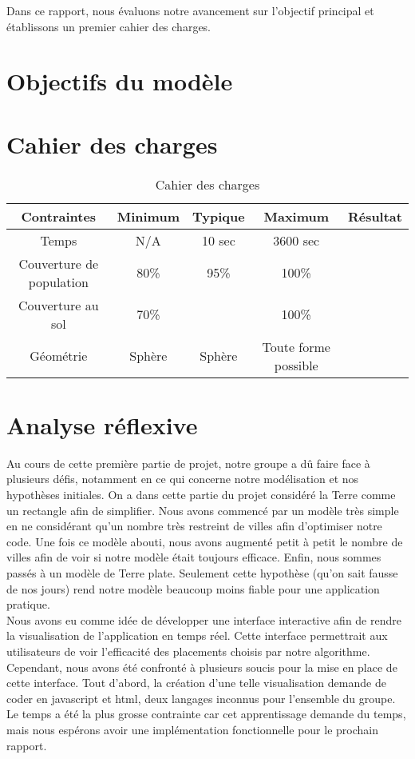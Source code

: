 \documentclass[a4paper]{article}
\begin{document}
Dans ce rapport, nous évaluons notre avancement sur l'objectif principal et établissons un premier cahier des charges.

\section{Objectifs du modèle}

\section{Cahier des charges}

\begin{table}[htbp]
\centering
\begin{tabular}{|c|c|c|c|c|}
\hline
Contraintes & Minimum & Typique & Maximum & Résultat \\
\hline
Temps & N/A & 10 sec & 3600 sec &  \\
\hline
Couverture de population & 80\% & 95\% & 100\% &  \\
\hline
Couverture au sol & 70\% &  & 100\% &  \\
\hline
Géométrie & Sphère & Sphère & Toute forme possible & \\
\hline
\end{tabular}
\caption{Cahier des charges}
\label{tab:my_table}
\end{table}

\section{Analyse réflexive}

Au cours de cette première partie de projet, notre groupe a dû faire face à plusieurs défis, notamment en ce qui concerne notre modélisation et nos hypothèses initiales. On a dans cette partie du projet considéré la Terre comme un rectangle afin de simplifier. Nous avons commencé par un modèle très simple en ne considérant qu'un nombre très restreint de villes afin d'optimiser notre code. Une fois ce modèle abouti, nous avons augmenté petit à petit le nombre de villes afin de voir si notre modèle était toujours efficace. Enfin, nous sommes passés à un modèle de Terre plate. 
Seulement cette hypothèse (qu'on sait fausse de nos jours) rend notre modèle beaucoup moins fiable pour une application pratique.\\
Nous avons eu comme idée de développer une interface interactive afin de rendre la visualisation de l'application en temps réel. Cette interface permettrait aux utilisateurs de voir l'efficacité des placements choisis par notre algorithme. Cependant, nous avons été confronté à plusieurs soucis pour la mise en place de cette interface. Tout d'abord, la création d'une telle visualisation demande de coder en javascript et html, deux langages inconnus pour l'ensemble du groupe. Le temps a été la plus grosse contrainte car cet apprentissage demande du temps, mais nous espérons avoir une implémentation fonctionnelle pour le prochain rapport. 
\\
\end{document}
